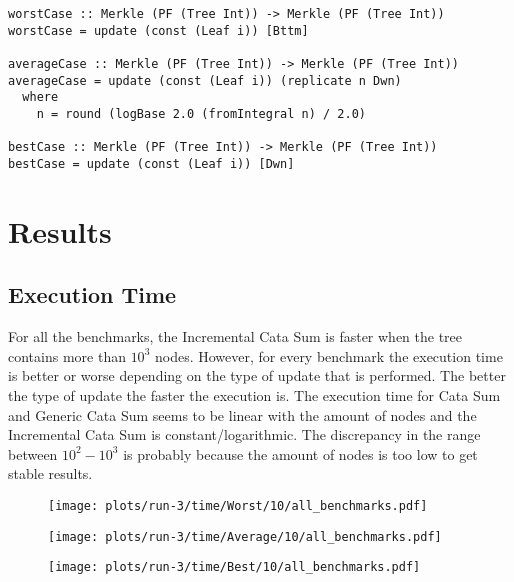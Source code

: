 \begin{verbatim}
worstCase :: Merkle (PF (Tree Int)) -> Merkle (PF (Tree Int))
worstCase = update (const (Leaf i)) [Bttm]

averageCase :: Merkle (PF (Tree Int)) -> Merkle (PF (Tree Int))
averageCase = update (const (Leaf i)) (replicate n Dwn)
  where
    n = round (logBase 2.0 (fromIntegral n) / 2.0)

bestCase :: Merkle (PF (Tree Int)) -> Merkle (PF (Tree Int))
bestCase = update (const (Leaf i)) [Dwn]
\end{verbatim}

\newpage
\section{Results}

\subsection{Execution Time}

For all the benchmarks, the Incremental Cata Sum is faster when the tree contains more than $10^3$ nodes. However, for every benchmark the execution time is better or worse depending on the type of update that is performed. The better the type of update the faster the execution is. The execution time for Cata Sum and Generic Cata Sum seems to be linear with the amount of nodes and the Incremental Cata Sum is constant/logarithmic. The discrepancy in the range between $10^2 - 10^3$ is probably because the amount of nodes is too low to get stable results.

\begin{figure}[H]
  \begin{minipage}{.5\textwidth}
    \centering
    \texttt{[image: plots/run-3/time/Worst/10/all\_benchmarks.pdf]}  
  \end{minipage}
  \begin{minipage}{.5\textwidth}
    \centering
    \texttt{[image: plots/run-3/time/Average/10/all\_benchmarks.pdf]}  
  \end{minipage}
\end{figure}

\begin{figure}[H]
  \centering
  \begin{minipage}[c]{.5\textwidth}
    \centering
    \texttt{[image: plots/run-3/time/Best/10/all\_benchmarks.pdf]}  
  \end{minipage}
\end{figure}

